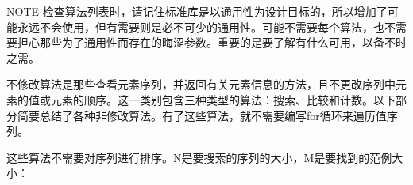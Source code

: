 \begin{myNotic}{NOTE}
检查算法列表时，请记住标准库是以通用性为设计目标的，所以增加了可能永远不会使用，但有需要则是必不可少的通用性。可能不需要每个算法，也不需要担心那些为了通用性而存在的晦涩参数。重要的是要了解有什么可用，以备不时之需。
\end{myNotic}


不修改算法是那些查看元素序列，并返回有关元素信息的方法，且不更改序列中元素的值或元素的顺序。这一类别包含三种类型的算法：搜索、比较和计数。以下部分简要总结了各种非修改算法。有了这些算法，就不需要编写for循环来遍历值序列。


这些算法不需要对序列进行排序。N是要搜索的序列的大小，M是要找到的范例大小：

